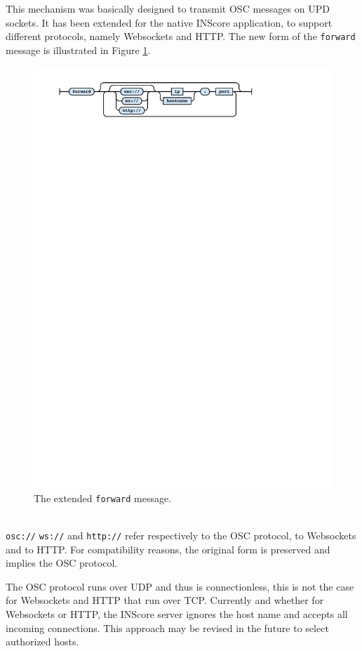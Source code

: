 \documentclass{article}
\newcommand{\icode}[1]	{{\small \texttt{#1}}}
\begin{document}
This mechanism was basically designed to transmit OSC messages on UPD sockets.
It has been extended for the native INScore application, to support different protocols, namely Websockets and HTTP. The new form of the \icode{forward} message is illustrated in Figure \ref{fig:newforward}.
\begin{figure}[h]
\centering
\includegraphics[width=0.98\columnwidth]{rsrc/faust4.pdf}
\caption{The extended \icode{forward} message.}
\label{fig:newforward}
\end{figure}\\
\icode{osc://} \icode{ws://} and \icode{http://} refer respectively to the OSC protocol, to Websockets and to HTTP.
For compatibility reasons, the original form is preserved and implies the OSC protocol.

The OSC protocol runs over UDP and thus is connectionless, this is not the case for Websockets and HTTP that run over TCP.
Currently and whether for Websockets or HTTP, the INScore server ignores the host name and accepts all incoming connections. This approach may be revised in the future to select authorized hosts.
\end{document}
